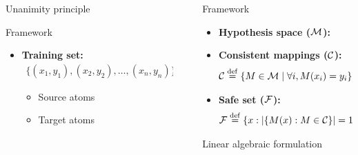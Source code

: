 \documentclass[final,table]{beamer}
\newlength{\sepwid}
\newlength{\onecolwid}
\begin{document}
\begin{frame}[t]
\begin{columns}[t]
\begin{column}{\onecolwid}
\begin{block}{Unanimity principle}
\begin{block}{Framework}
\begin{itemize}
\item[] {\bf Training set:}
\begin{align*}
\{(x_1,y_1),(x_2,y_2),\dots, (x_n,y_n)\}
\end{align*} 
\begin{itemize}
\item[] Source atoms

\item[] Target atoms

\end{itemize}
\end{itemize}
\end{block}
\end{block}

\end{column} %

\begin{column}{\sepwid}\end{column} %

\begin{column}{\onecolwid} %



\begin{block}{Framework}
\begin{itemize}
\item[] {\bf Hypothesis space ($\mathcal{M}$):}
\vspace{1cm}

\vspace{1cm}
\item[] {\bf Consistent mappings ($\mathcal{C}$):} 
\vspace{1cm}
\begin{align*} 
\mathcal{C} \stackrel{\rm def}{=} \{ M \in \mathcal{M} \mid \forall i, M(x_i) = y_i\}
\end{align*}

\vspace{1cm}
\item[] {\bf Safe set ($\mathcal{F}$):} 
\vspace{1cm}
\begin{align*}
\mathcal{F} \stackrel{\rm def}{=} \{ x : |\{ M(x) : M \in \mathcal{C} \}| = 1 \}
\end{align*}

\end{itemize}
\end{block}
\begin{block}{Linear algebraic formulation}


\end{block}
\end{column}
\end{columns}
\end{frame}
\end{document}
